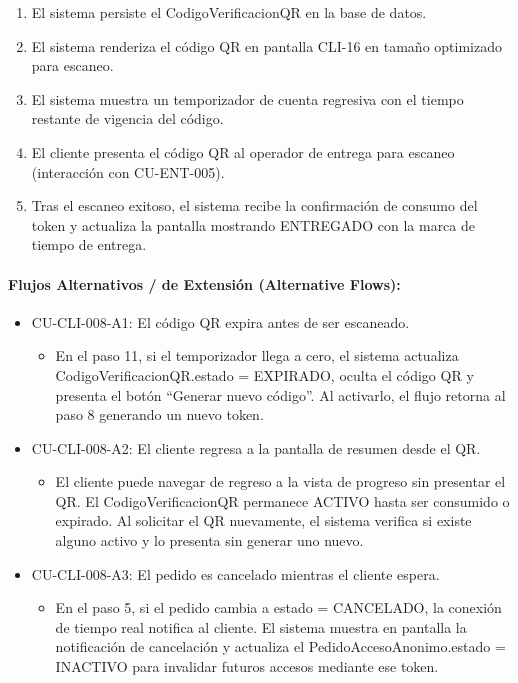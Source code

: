 \begin{enumerate}
    \item[IX.] El sistema persiste el CodigoVerificacionQR en la base de datos.
    \item[X.] El sistema renderiza el código QR en pantalla CLI-16 en tamaño optimizado para escaneo.
    \item[XI.] El sistema muestra un temporizador de cuenta regresiva con el tiempo restante de vigencia del código.
    \item[XII.] El cliente presenta el código QR al operador de entrega para escaneo (interacción con CU-ENT-005).
    \item[XIII.] Tras el escaneo exitoso, el sistema recibe la confirmación de consumo del token y actualiza la pantalla mostrando ENTREGADO con la marca de tiempo de entrega.
\end{enumerate}

\paragraph{Flujos Alternativos / de Extensión (Alternative Flows):}
\begin{itemize}
    \item CU-CLI-008-A1: El código QR expira antes de ser escaneado.
    \begin{itemize}
        \item En el paso 11, si el temporizador llega a cero, el sistema actualiza CodigoVerificacionQR.estado = EXPIRADO, oculta el código QR y presenta el botón ``Generar nuevo código''. Al activarlo, el flujo retorna al paso 8 generando un nuevo token.
    \end{itemize}
    \item CU-CLI-008-A2: El cliente regresa a la pantalla de resumen desde el QR.
    \begin{itemize}
        \item El cliente puede navegar de regreso a la vista de progreso sin presentar el QR. El CodigoVerificacionQR permanece ACTIVO hasta ser consumido o expirado. Al solicitar el QR nuevamente, el sistema verifica si existe alguno activo y lo presenta sin generar uno nuevo.
    \end{itemize}
    \item CU-CLI-008-A3: El pedido es cancelado mientras el cliente espera.
    \begin{itemize}
        \item En el paso 5, si el pedido cambia a estado = CANCELADO, la conexión de tiempo real notifica al cliente. El sistema muestra en pantalla la notificación de cancelación y actualiza el PedidoAccesoAnonimo.estado = INACTIVO para invalidar futuros accesos mediante ese token.
    \end{itemize}
\end{itemize}

